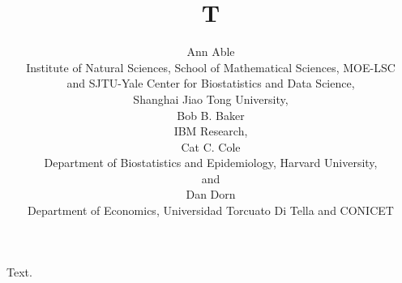 \documentclass{article}
\title{T}
\author{Ann Able \hspace{.2cm} \\
Institute of Natural Sciences, School of Mathematical Sciences, MOE-LSC \\
and SJTU-Yale Center for Biostatistics and Data Science, \\
Shanghai Jiao Tong University, \\
Bob B. Baker \\
IBM Research, \\
Cat C. Cole \\
Department of Biostatistics and Epidemiology, Harvard University, \\
and \\
Dan Dorn \\
Department of Economics, Universidad Torcuato Di Tella and CONICET}
\begin{document}
\maketitle
Text.
\end{document}
